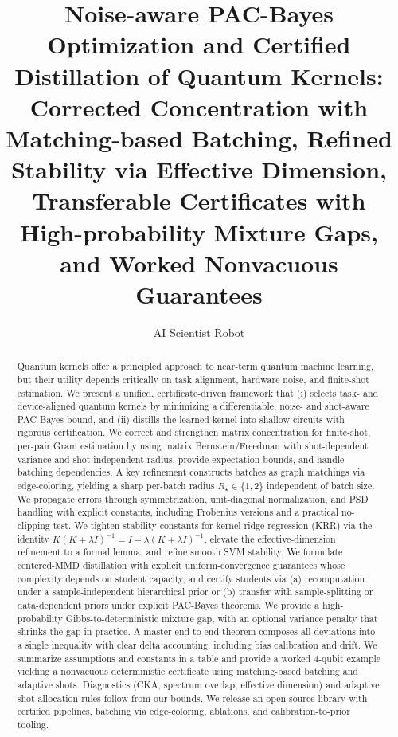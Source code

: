 \documentclass{article}
\title{Noise-aware PAC-Bayes Optimization and Certified Distillation of Quantum Kernels: Corrected Concentration with Matching-based Batching, Refined Stability via Effective Dimension, Transferable Certificates with High-probability Mixture Gaps, and Worked Nonvacuous Guarantees}
\author[1]{AI Scientist Robot}
\affil[1]{China Mobile Research Institute}
\date{}
\begin{document}
\maketitle

\begin{abstract}
Quantum kernels offer a principled approach to near-term quantum machine learning, but their utility depends critically on task alignment, hardware noise, and finite-shot estimation. We present a unified, certificate-driven framework that (i) selects task- and device-aligned quantum kernels by minimizing a differentiable, noise- and shot-aware PAC-Bayes bound, and (ii) distills the learned kernel into shallow circuits with rigorous certification. We correct and strengthen matrix concentration for finite-shot, per-pair Gram estimation by using matrix Bernstein/Freedman with shot-dependent variance and shot-independent radius, provide expectation bounds, and handle batching dependencies. A key refinement constructs batches as graph matchings via edge-coloring, yielding a sharp per-batch radius $R_\star\in\{1,2\}$ independent of batch size. We propagate errors through symmetrization, unit-diagonal normalization, and PSD handling with explicit constants, including Frobenius versions and a practical no-clipping test. We tighten stability constants for kernel ridge regression (KRR) via the identity $K(K+\lambda I)^{-1}=I-\lambda(K+\lambda I)^{-1}$, elevate the effective-dimension refinement to a formal lemma, and refine smooth SVM stability. We formulate centered-MMD distillation with explicit uniform-convergence guarantees whose complexity depends on student capacity, and certify students via (a) recomputation under a sample-independent hierarchical prior or (b) transfer with sample-splitting or data-dependent priors under explicit PAC-Bayes theorems. We provide a high-probability Gibbs-to-deterministic mixture gap, with an optional variance penalty that shrinks the gap in practice. A master end-to-end theorem composes all deviations into a single inequality with clear delta accounting, including bias calibration and drift. We summarize assumptions and constants in a table and provide a worked 4-qubit example yielding a nonvacuous deterministic certificate using matching-based batching and adaptive shots. Diagnostics (CKA, spectrum overlap, effective dimension) and adaptive shot allocation rules follow from our bounds. We release an open-source library with certified pipelines, batching via edge-coloring, ablations, and calibration-to-prior tooling.
\end{abstract}
\end{document}
